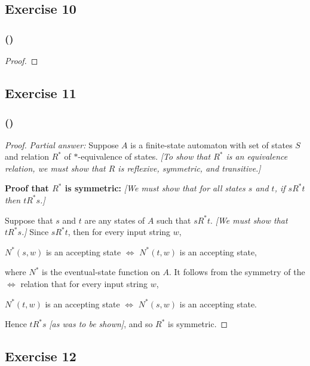 \documentclass[14pt]{extarticle}
\begin{document}
\subsection{Exercise 10}

\subsubsection{()}

\begin{proof}

\end{proof}

\subsection{Exercise 11}

\subsubsection{()}

\begin{proof}
{\it Partial answer:} Suppose \(A\) is a finite-state automaton with set of states \(S\) and relation \(R^*\) of 
\(*\)-equivalence of states. {\it [To show that \(R^*\) is an equivalence relation, we must show that \(R\) is reflexive, 
symmetric, and transitive.]}

{\bf Proof that \(R^*\) is symmetric:} {\it [We must show that for all states \(s\) and \(t\), if \(sR^*t\) then \(tR^*s\).]}

Suppose that \(s\) and \(t\) are any states of \(A\) such that \(sR^*t\). {\it [We must show that \(tR^*s\).]} Since 
\(sR^*t\), then for every input string \(w\),

\(N^*(s, w)\) is an accepting state \(\iff\) \(N^*(t, w)\) is an accepting state,

where \(N^*\) is the eventual-state function on \(A\). It follows from the symmetry of the \(\iff\) relation that for 
every input string \(w\), 

\(N^*(t, w)\) is an accepting state \(\iff\) \(N^*(s, w)\) is an accepting state.

Hence \(tR^*s\) {\it [as was to be shown]}, and so \(R^*\) is symmetric.
\end{proof}

\subsection{Exercise 12}
\end{document}
